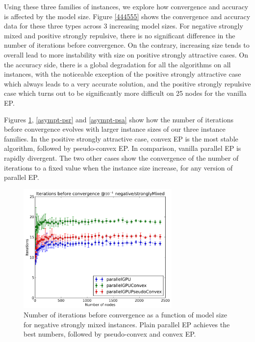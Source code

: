 \documentclass[times, 10pt,twocolumn]{article}
\begin{document}
Using these three families of instances, we explore how convergence and accuracy is affected by the model size. Figure \ref{444555} shows the convergence and accuracy data for these three types across 3 increasing model sizes. For negative strongly mixed and positive strongly repulsive, there is no significant difference in the number of iterations before convergence. On the contrary, increasing size tends to overall lead to more instability with size on positive strongly attractive cases. On the accuracy side, there is a global degradation for all the algorithms on all instances, with the noticeable exception of the positive strongly attractive case which always leads to a very accurate solution, and the positive strongly repulsive case which turns out to be significantly more difficult on 25 nodes for the vanilla EP.

Figures \ref{asympt-nsm}, \ref{asympt-psr} and \ref{asympt-psa} show how
the number of iterations before convergence evolves with larger instance
sizes of our three instance families. In the positive strongly attractive
case, convex EP is the most stable algorithm, followed by pseudo-convex EP.
In comparison, vanilla parallel EP is rapidly divergent. The two other
cases show the convergence of the number of iterations to a fixed value
when the instance size increase, for any version of parallel EP. 

\begin{figure}[h!]\centering
	\includegraphics[width=8cm]{plots/sizes/Iterations_before_convergence_e-4_negative_stronglyMixed.png}
	\caption{Number of iterations before convergence as a function of model size for negative strongly mixed instances. Plain parallel EP achieves the best numbers, followed by pseudo-convex and convex EP.}
	\label{asympt-nsm}
\end{figure}
\end{document}
